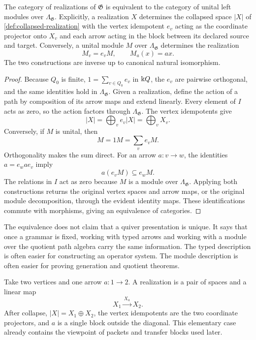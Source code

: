 \begin{theorem}
\label{thm:typed-module-equivalence}
The category of realizations of $\mathfrak G$ is equivalent to the category of unital left modules over $\Lambda_{\mathfrak G}$.  Explicitly, a realization $X$ determines the collapsed space $|X|$ of \cref{def:collapsed-realization}
with the vertex idempotent $e_v$ acting as the coordinate projector onto $X_v$ and each arrow acting in the block between its declared source and target.  Conversely, a unital module $M$ over $\Lambda_{\mathfrak G}$ determines the realization
\[
M_v=e_vM,
\qquad
M_a(x)=ax.
\]
The two constructions are inverse up to canonical natural isomorphism.
\end{theorem}

\begin{proof}
Because $Q_0$ is finite, $1=\sum_{v\in Q_0}e_v$ in $\Bbbk Q$, the $e_v$ are pairwise orthogonal, and the same identities hold in $\Lambda_{\mathfrak G}$.  Given a realization, define the action of a path by composition of its arrow maps and extend linearly.  Every element of $I$ acts as zero, so the action factors through $\Lambda_{\mathfrak G}$.  The vertex idempotents give
\[
|X|=\bigoplus_v e_v|X|=\bigoplus_vX_v.
\]
Conversely, if $M$ is unital, then
\[
M=1M=\sum_ve_vM.
\]
Orthogonality makes the sum direct.  For an arrow $a:v\to w$, the identities $a=e_wae_v$ imply
\[
a(e_vM)\subseteq e_wM.
\]
The relations in $I$ act as zero because $M$ is a module over $\Lambda_{\mathfrak G}$.  Applying both constructions returns the original vertex spaces and arrow maps, or the original module decomposition, through the evident identity maps.  These identifications commute with morphisms, giving an equivalence of categories.
\end{proof}

\begin{interpretation}
The equivalence does not claim that a quiver presentation is unique.  It says that once a grammar is fixed, working with typed arrows and working with a module over the quotient path algebra carry the same information.  The typed description is often easier for constructing an operator system.  The module description is often easier for proving generation and quotient theorems.
\end{interpretation}

\begin{microexample}[title={A grammar with two vertices}]
Take two vertices and one arrow \(a:1\to2\).  A realization is a pair of spaces and a linear map
\[
X_1\xrightarrow{\,X_a\,}X_2.
\]
After collapse, \(|X|=X_1\oplus X_2\), the vertex idempotents are the two coordinate projectors, and \(a\) is a single block outside the diagonal.  This elementary case already contains the viewpoint of packets and transfer blocks used later.
\end{microexample}


